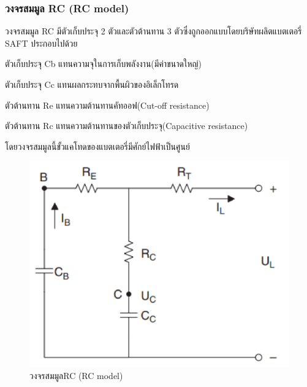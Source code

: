 \subsubsection*{วงจรสมมูล RC (RC model)}
วงจรสมมูล RC มีตัวเก็บประจุ 2 ตัวและตัวต้านทาน 3 ตัวซึ่งถูกออกแบบโดยบริษัทผลิตแบตเตอรี่ SAFT ประกอบไปด้วย
\begin{itemize}
	{\item 	ตัวเก็บประจุ Cb แทนความจุในการเก็บพลังงาน(มีค่าขนาดใหญ่)}
	{\item 	ตัวเก็บประจุ Cc แทนผลกระทบจากพื้นผิวของอิเล็กโทรด}
	{\item 	ตัวต้านทาน Re แทนความต้านทานคัทออฟ(Cut-off resistance)}
	{\item 	ตัวต้านทาน Rc แทนความต้านทานของตัวเก็บประจุ(Capacitive resistance)}
\end{itemize}
โดยวงจรสมมูลนี้ขั้วแคโทดของแบตเตอรี่มีศักย์ไฟฟ้าเป็นศูนย์
\begin{center}
	\begin{figure}[H]
		\includegraphics[width=0.6\linewidth]{Chapters/img/RC_model.png}
			\centering
			\captionsetup{justification=centering,margin=2cm}
			\caption{วงจรสมมูลRC (RC model)}
	\end{figure}
\end{center}
